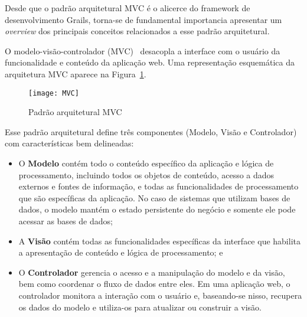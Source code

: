 \vspace{0.3cm}

Desde que o padrão arquitetural MVC é o alicerce do framework de desenvolvimento
Grails,  torna-se de fundamental  importancia apresentar  um {\it  overview} dos
principais conceitos relacionados a esse padrão arquitetural.

O modelo-visão-controlador  (MVC)~\cite{KP88, Pressman11} desacopla  a interface
com o usuário  da funcionalidade e conteúdo da  aplicação web. Uma representação
esquemática da arquitetura MVC aparece na Figura~\ref{MVCFig}. 

\begin{figure}[htbp]
\centering\texttt{[image: MVC]}
\caption{Padrão arquitetural MVC}
\label{MVCFig}
\end{figure}

Esse padrão  arquitetural define três componentes (Modelo,  Visão e Controlador)
com características bem delineadas:

\begin{itemize}

\vspace{0.3cm}

\item O {\bf Modelo} contém todo  o conteúdo específico da aplicação e lógica de
  processamento, incluindo todos os objetos de conteúdo, acesso a dados externos
  e fontes  de informação, e todas  as funcionalidades de  processamento que são
  específicas da aplicação.  No caso de sistemas que utilizam  bases de dados, o
  modelo mantém  o estado persistente do  negócio e somente ele  pode acessar as
  bases de dados;

\item A {\bf Visão} contém todas as funcionalidades específicas da interface que
  habilita a apresentação de conteúdo e lógica de processamento; e

\vspace{0.3cm}

\item  O {\bf Controlador}  gerencia o  acesso e  a manipulação  do modelo  e da
  visão, bem como coordenar o fluxo de dados entre eles. Em uma aplicação web, o
  controlador monitora a interação com  o usuário e, baseando-se nisso, recupera
  os dados do modelo e utiliza-os para atualizar ou construir a visão.

\end{itemize}

\vspace{0.2cm}

